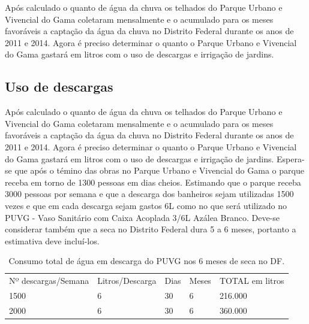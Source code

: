 	Após calculado o quanto de água da chuva os telhados do Parque Urbano e Vivencial do Gama coletaram mensalmente e o acumulado para os meses favoráveis a captação da água da chuva no Distrito Federal durante os anos de 2011 e 2014. Agora é preciso determinar o quanto o Parque Urbano e Vivencial do Gama gastará em litros com o uso de descargas e irrigação de jardins.  
	
\subsection{Uso de descargas}

	Após calculado o quanto de água da chuva os telhados do Parque Urbano e Vivencial do Gama coletaram mensalmente e o acumulado para os meses favoráveis a captação da água da chuva no Distrito Federal durante os anos de 2011 e 2014. Agora é preciso determinar o quanto o Parque Urbano e Vivencial do Gama gastará em litros com o uso de descargas e irrigação de jardins.  
	Espera-se que após o témino das obras no Parque Urbano e Vivencial do Gama o parque receba em torno de 1300 pessoas em dias cheios. Estimando que o parque receba 3000 pessoas por semana e que a descarga dos banheiros sejam utilizadas 1500 vezes e que em cada descarga sejam gastos 6L como no que será utilizado no PUVG - Vaso Sanitário com Caixa Acoplada 3/6L Azálea Branco. Deve-se considerar também que a seca no Distrito Federal dura 5 a 6 meses, portanto a estimativa deve incluí-los. 
	
\begin{table}[h]
\centering
\caption{Consumo total de água em descarga do PUVG nos 6 meses de seca no DF.}
\label{Consumo total de água em descarga do PUVG nos 6 meses de seca no DF.}
\begin{tabular}{lllll}
 &  &  &  &  \\ \hline
\multicolumn{1}{|l|}{Nº descargas/Semana} & \multicolumn{1}{l|}{Litros/Descarga} & \multicolumn{1}{l|}{Dias} & \multicolumn{1}{l|}{Meses} & \multicolumn{1}{l|}{TOTAL em litros} \\ \hline
\multicolumn{1}{|l|}{1500} & \multicolumn{1}{l|}{6} & \multicolumn{1}{l|}{30} & \multicolumn{1}{l|}{6} & \multicolumn{1}{l|}{216.000} \\ \hline
\multicolumn{1}{|l|}{2000} & \multicolumn{1}{l|}{6} & \multicolumn{1}{l|}{30} & \multicolumn{1}{l|}{6} & \multicolumn{1}{l|}{360.000} \\ \hline
\end{tabular}
\end{table}

